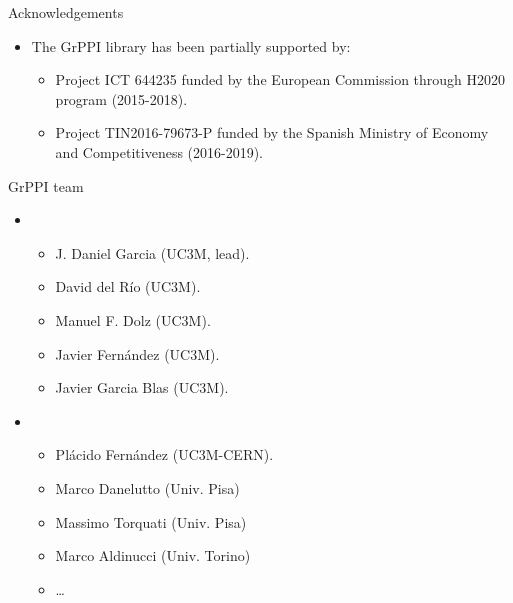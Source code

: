 \begin{frame}[t]{Acknowledgements}
\begin{itemize}
  \item The GrPPI library has been partially supported by:
    \begin{itemize}
      \item Project ICT 644235  
            funded by the European Commission through H2020 program (2015-2018).
      \item Project TIN2016-79673-P  
            funded by the Spanish Ministry of Economy and Competitiveness (2016-2019).
    \end{itemize}
\end{itemize}
\end{frame}

\begin{frame}[t]{GrPPI team}
\begin{itemize}
  \item {}
  \begin{itemize}
    \item J. Daniel Garcia (UC3M, lead).
    \item David del Río (UC3M).
    \item Manuel F. Dolz (UC3M).
    \item Javier Fernández (UC3M).
    \item Javier Garcia Blas (UC3M).
  \end{itemize}
  \vfill
  \item {}
  \begin{itemize}
    \item Plácido Fernández (UC3M-CERN).
    \item Marco Danelutto (Univ. Pisa)
    \item Massimo Torquati (Univ. Pisa)
    \item Marco Aldinucci (Univ. Torino)
    \item \ldots
  \end{itemize}
\end{itemize}
\end{frame}
